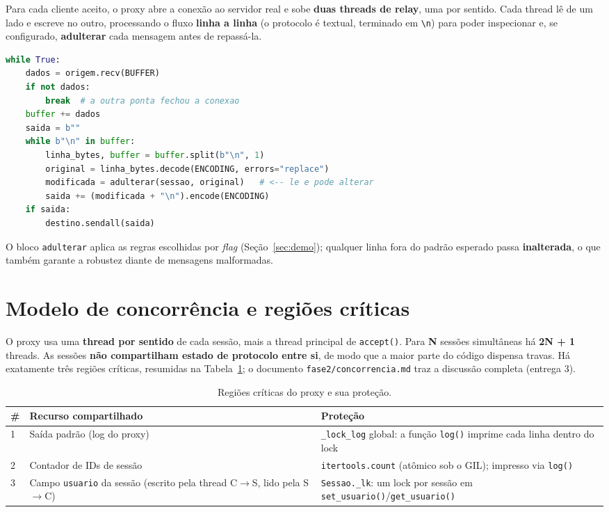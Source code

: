 \documentclass[11pt,a4paper]{article}
\begin{document}
Para cada cliente aceito, o proxy abre a conexão ao servidor real e sobe
\textbf{duas threads de relay}, uma por sentido. Cada thread lê de um lado e
escreve no outro, processando o fluxo \textbf{linha a linha} (o protocolo é
textual, terminado em \texttt{\textbackslash n}) para poder inspecionar e, se
configurado, \textbf{adulterar} cada mensagem antes de repassá-la.

\begin{lstlisting}[language=Python,caption={Núcleo do relay de um sentido, com ponto de adulteração (trecho de \texttt{proxy\_mitm.py}).}]
while True:
    dados = origem.recv(BUFFER)
    if not dados:
        break  # a outra ponta fechou a conexao
    buffer += dados
    saida = b""
    while b"\n" in buffer:
        linha_bytes, buffer = buffer.split(b"\n", 1)
        original = linha_bytes.decode(ENCODING, errors="replace")
        modificada = adulterar(sessao, original)   # <-- le e pode alterar
        saida += (modificada + "\n").encode(ENCODING)
    if saida:
        destino.sendall(saida)
\end{lstlisting}

O bloco \texttt{adulterar} aplica as regras escolhidas por \textit{flag}
(Seção~\ref{sec:demo}); qualquer linha fora do padrão esperado passa
\textbf{inalterada}, o que também garante a robustez diante de mensagens
malformadas.

\section{Modelo de concorrência e regiões críticas}

O proxy usa uma \textbf{thread por sentido} de cada sessão, mais a thread
principal de \texttt{accept()}. Para \textbf{N} sessões simultâneas há
\textbf{2N + 1} threads. As sessões \textbf{não compartilham estado de protocolo
entre si}, de modo que a maior parte do código dispensa travas. Há exatamente
três regiões críticas, resumidas na Tabela~\ref{tab:regioes}; o documento
\texttt{fase2/concorrencia.md} traz a discussão completa (entrega 3).

\begin{table}[h]
\centering\small
\begin{tabular}{@{}lp{4.1cm}p{5.6cm}@{}}
\toprule
\textbf{\#} & \textbf{Recurso compartilhado} & \textbf{Proteção} \\
\midrule
1 & Saída padrão (log do proxy) & \texttt{\_lock\_log} global: a função \texttt{log()} imprime cada linha dentro do lock \\
2 & Contador de IDs de sessão & \texttt{itertools.count} (atômico sob o GIL); impresso via \texttt{log()} \\
3 & Campo \texttt{usuario} da sessão (escrito pela thread C$\rightarrow$S, lido pela S$\rightarrow$C) & \texttt{Sessao.\_lk}: um lock por sessão em \texttt{set\_usuario()}/\texttt{get\_usuario()} \\
\bottomrule
\end{tabular}
\caption{Regiões críticas do proxy e sua proteção.}
\label{tab:regioes}
\end{table}
\end{document}
